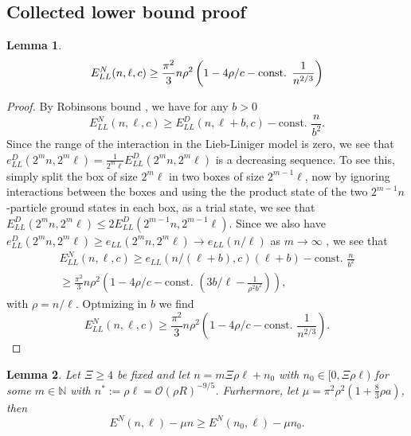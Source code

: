 \documentclass[a4paper,11pt]{article}
\newtheorem{lemma}{Lemma}
\numberwithin{equation}{section}
\begin{document}
	\subsection{Collected lower bound proof}
		\begin{lemma}\label{LemmaLiebLinigerNeumannLowerBound}
		\begin{equation}
		E_{LL}^{N}(n,\ell,c)\geq \frac{\pi^2}{3}n\rho^2\left(1-4\rho/c-\textnormal{const. }\frac{1}{n^{2/3}}\right)
		\end{equation}
	\end{lemma}
	\begin{proof}
		By Robinsons bound \cite{robinson2014thermodynamic}, we have for any $ b>0 $ \begin{equation}
		E_{LL}^{N}(n,\ell,c)\geq E_{LL}^D(n,\ell+b,c)-\text{const. }\frac{n}{b^2}.
		\end{equation}
		Since the range of the interaction in the Lieb-Liniger model is zero, we see that $ e^D_{LL}(2^mn,2^m\ell)=\frac{1}{2^m\ell}E_{LL}^{D}(2^mn,2^m\ell) $ is a decreasing sequence. To see this, simply split the box of size $ 2^m\ell $ in two boxes of size $ 2^{m-1}\ell $, now by ignoring interactions between the boxes and using the the product state of the two $ 2^{m-1}n $-particle ground states in each box, as a trial state, we see that $ E^D_{LL}(2^{m}n,2^m\ell)\leq 2E^D_{LL}(2^{m-1}n,2^{m-1}\ell)  $. Since we also have $ e^D_{LL}(2^mn,2^m\ell)\geq e_{LL}(2^mn,2^m\ell)\to e_{LL}(n/\ell) $ as $ m\to\infty $ \cite{PhysRev.130.1605}, we see that \begin{equation}
		\begin{aligned}
		E_{LL}^{N}(n,\ell,c)\geq e_{LL}(n/(\ell+b),c)(\ell+b)-\text{const. }\frac{n}{b^2}\\\geq \frac{\pi^2}{3}n\rho^2\left(1-4\rho/c-\text{const. }\left(3b/\ell-\frac{1}{\rho^2b^2}\right)\right),
		\end{aligned}
		\end{equation}
		with $ \rho=n/\ell $. Optmizing in $ b $ we find \begin{equation}
		E_{LL}^{N}(n,\ell,c)\geq \frac{\pi^2}{3}n\rho^2\left(1-4\rho/c-\text{const. }\frac{1}{n^{2/3}}\right).
		\end{equation}
	\end{proof}
	\begin{lemma}\label{LemmaLocalizationFbound}
		Let $ \Xi\geq 4 $ be fixed and let $ n=m\Xi \rho \ell+n_0 $ with $ n_0\in[0,\Xi\rho \ell) $ for some $ m\in\mathbb{N} $ with $ n^{\ast}:=\rho\ell=\mathcal{O}(\rho R)^{-9/5} $. Furhermore, let $ \mu=\pi^2\rho^2\left(1+\frac{8}{3}\rho a\right) $, then \begin{equation}
		E^{N}(n,\ell)-\mu n \geq E^{N}(n_0,\ell)-\mu n_0.
		\end{equation}
	\end{lemma}
\end{document}
